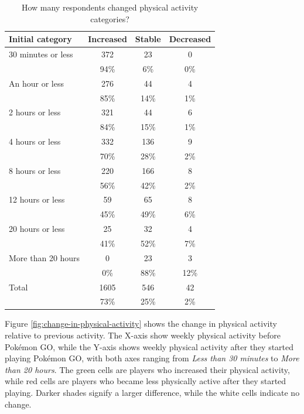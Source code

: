 \begin{table}[h]
	\centering
	\caption{How many respondents changed physical activity categories?}
	\label{tbl:physical-activity-changed-category}
	\begin{tabular}{|l|c|c|c|}
		\hline
		\textbf{Initial category} & \textbf{Increased} & \textbf{Stable} & \textbf{Decreased}\\
		\hline\hline
		30 minutes or less	& 372	& 23	& 0\\
		& 94\%	& 6\%	& 0\%\\\hline
		An hour or less		& 276	& 44	& 4\\
		& 85\%	& 14\%	& 1\%\\\hline
		2 hours or less		& 321	& 44	& 6\\
		& 84\%	& 15\%	& 1\%\\\hline
		4 hours or less		& 332	& 136	& 9\\
		& 70\%	& 28\%	& 2\%\\\hline
		8 hours or less		& 220	& 166	& 8\\
		& 56\%	& 42\%	& 2\%\\\hline
		12 hours or less	& 59	& 65	& 8\\
		& 45\%	& 49\%	& 6\%\\\hline
		20 hours or less	& 25	& 32	& 4\\
		& 41\%	& 52\%	& 7\%\\\hline
		More than 20 hours	& 0		& 23	& 3\\
		& 0\%	& 88\%	& 12\%\\\hline
		\hline
		Total				& 1605	& 546	& 42\\
		& 73\%	& 25\%	& 2\%\\\hline
	\end{tabular}
\end{table}

Figure \ref{fig:change-in-physical-activity} shows the change in physical activity relative to previous activity. The X-axis show weekly physical activity before Pokémon GO, while the Y-axis shows weekly physical activity after they started playing Pokémon GO, with both axes ranging from \emph{Less than 30 minutes} to \emph{More than 20 hours}. The green cells are players who increased their physical activity, while red cells are players who became less physically active after they started playing. Darker shades signify a larger difference, while the white cells indicate no change. 

